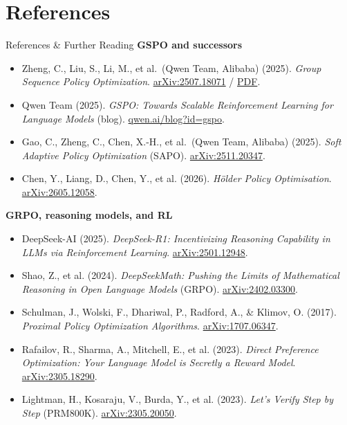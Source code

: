 \section{References}
\begin{frame}[allowframebreaks]{References \& Further Reading}
  \small
  \textbf{GSPO and successors}
  \begin{itemize}\itemsep0.3em
    \item Zheng, C., Liu, S., Li, M., et al.\ (Qwen Team, Alibaba) (2025).
      \emph{Group Sequence Policy Optimization}.
      \href{https://arxiv.org/abs/2507.18071}{arXiv:2507.18071} /
      \href{https://arxiv.org/pdf/2507.18071}{PDF}.
    \item Qwen Team (2025).
      \emph{GSPO: Towards Scalable Reinforcement Learning for Language Models} (blog).
      \href{https://qwen.ai/blog?id=gspo}{qwen.ai/blog?id=gspo}.
    \item Gao, C., Zheng, C., Chen, X.-H., et al.\ (Qwen Team, Alibaba) (2025). \emph{Soft Adaptive Policy Optimization} (SAPO). \href{https://arxiv.org/abs/2511.20347}{arXiv:2511.20347}.
    \item Chen, Y., Liang, D., Chen, Y., et al. (2026). \emph{H\"older Policy Optimisation}. \href{https://arxiv.org/abs/2605.12058}{arXiv:2605.12058}.
  \end{itemize}
  \vspace{0.4em}
  \textbf{GRPO, reasoning models, and RL}
  \begin{itemize}\itemsep0.3em
    \item DeepSeek-AI (2025). \emph{DeepSeek-R1: Incentivizing Reasoning Capability in LLMs via Reinforcement Learning}. \href{https://arxiv.org/abs/2501.12948}{arXiv:2501.12948}.
    \item Shao, Z., et al. (2024). \emph{DeepSeekMath: Pushing the Limits of Mathematical Reasoning in Open Language Models} (GRPO). \href{https://arxiv.org/abs/2402.03300}{arXiv:2402.03300}.
    \item Schulman, J., Wolski, F., Dhariwal, P., Radford, A., \& Klimov, O. (2017). \emph{Proximal Policy Optimization Algorithms}. \href{https://arxiv.org/abs/1707.06347}{arXiv:1707.06347}.
    \item Rafailov, R., Sharma, A., Mitchell, E., et al. (2023). \emph{Direct Preference Optimization: Your Language Model is Secretly a Reward Model}. \href{https://arxiv.org/abs/2305.18290}{arXiv:2305.18290}.
    \item Lightman, H., Kosaraju, V., Burda, Y., et al. (2023). \emph{Let's Verify Step by Step} (PRM800K). \href{https://arxiv.org/abs/2305.20050}{arXiv:2305.20050}.

\end{itemize}
\end{frame}
